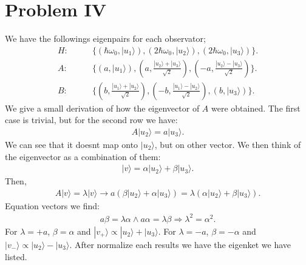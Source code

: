 \documentclass[letterpaper,11pt,twoside]{article}
\newcommand{\ket}[1]{|#1\rangle}
\begin{document}
\section*{Problem IV}
We have the followings eigenpairs for each observator;
\begin{align*}
  H:\qquad&\{(\hbar\omega_0,\ket{u_1}),(2\hbar\omega_0,\ket{u_2}),(2\hbar\omega_0,\ket{u_3})\}.\\
  A:\qquad&\{(a,\ket{u_1}),(a,\frac{\ket{u_2}+\ket{u_3}}{\sqrt{2}}),(-a,\frac{\ket{u_2}-\ket{u_3}}{\sqrt{2}})\}.\\
  B:\qquad&\{(b,\frac{\ket{u_1}+\ket{u_2}}{\sqrt{2}}),(-b,\frac{\ket{u_1}-\ket{u_2}}{\sqrt{2}}),(b,\ket{u_3})\}.
\end{align*}
We give a small derivation of how the eigenvector of $A$ were obtained. The first case is trivial, but for the second row we have:
\begin{align*}
  A\ket{u_2}=a\ket{u_3}.
\end{align*}
We can see that it doesnt map onto $\ket{u_2}$, but on other vector. We then think of the eigenvector as a combination of them:
\begin{align*}
  \ket{v}=\alpha\ket{u_2}+\beta\ket{u_3}.
\end{align*}
Then,
\begin{align*}
  A\ket{v}=\lambda\ket{v}\longrightarrow a(\beta\ket{u_2}+\alpha\ket{u_3})=\lambda(\alpha\ket{u_2}+\beta\ket{u_3}).
\end{align*}
Equation vectors we find:
\begin{align*}
  a\beta=\lambda\alpha\land a\alpha=\lambda\beta\Longrightarrow\lambda^2=\alpha^2.
\end{align*}
For $\lambda=+a$, $\beta=\alpha$ and $\ket{v_+}\propto\ket{u_2}+\ket{u_3}$. For $\lambda=-a$, $\beta=-\alpha$ and $\ket{v_-}\propto\ket{u_2}-\ket{u_3}$. After normalize each 
results we have the eigenket we have listed.
\end{document}
